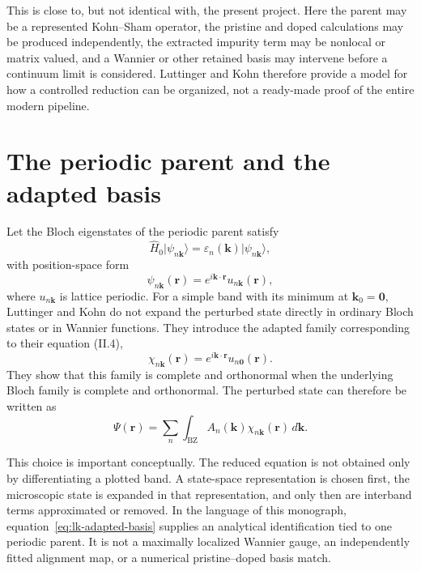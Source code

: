 This is close to, but not identical with, the present project. Here the parent
may be a represented Kohn--Sham operator, the pristine and doped calculations
may be produced independently, the extracted impurity term may be nonlocal or
matrix valued, and a Wannier or other retained basis may intervene before a
continuum limit is considered. Luttinger and Kohn therefore provide a model for
how a controlled reduction can be organized, not a ready-made proof of the
entire modern pipeline.

\section{The periodic parent and the adapted basis}

Let the Bloch eigenstates of the periodic parent satisfy
\begin{equation}
  \hat H_0\lvert\psi_{n\mathbf k}\rangle
  =
  \varepsilon_n(\mathbf k)
  \lvert\psi_{n\mathbf k}\rangle,
\end{equation}
with position-space form
\begin{equation}
  \psi_{n\mathbf k}(\mathbf r)
  =
  e^{i\mathbf k\cdot\mathbf r}
  u_{n\mathbf k}(\mathbf r),
\end{equation}
where $u_{n\mathbf k}$ is lattice periodic. For a simple band with its minimum
at $\mathbf k_0=\mathbf 0$, Luttinger and Kohn do not expand the perturbed state
directly in ordinary Bloch states or in Wannier functions. They introduce the
adapted family corresponding to their equation (II.4),
\begin{equation}
  \chi_{n\mathbf k}(\mathbf r)
  =
  e^{i\mathbf k\cdot\mathbf r}u_{n\mathbf 0}(\mathbf r).
  \label{eq:lk-adapted-basis}
\end{equation}
They show that this family is complete and orthonormal when the underlying
Bloch family is complete and orthonormal. The perturbed state can therefore be
written as
\begin{equation}
  \Psi(\mathbf r)
  =
  \sum_n\int_{\mathrm{BZ}}
  A_n(\mathbf k)\chi_{n\mathbf k}(\mathbf r)\,d\mathbf k.
  \label{eq:lk-state-expansion}
\end{equation}

This choice is important conceptually. The reduced equation is not obtained
only by differentiating a plotted band. A state-space representation is chosen
first, the microscopic state is expanded in that representation, and only then
are interband terms approximated or removed. In the language of this
monograph, equation~\eqref{eq:lk-adapted-basis} supplies an analytical
identification tied to one periodic parent. It is not a maximally localized
Wannier gauge, an independently fitted alignment map, or a numerical
pristine--doped basis match.


